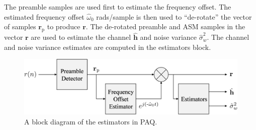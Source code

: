 The preamble samples are used first to estimate the frequency offset.
The estimated frequency offset $\hat{\omega}_0$ rads/sample is then used to ``de-rotate'' the vector of samples $\mathbf{r}_\text{p}$ to produce $\mathbf{r}$.
The de-rotated preamble and ASM samples in the vector $\mathbf{r}$ are used to estimate the channel $\hat{\mathbf{h}}$ and noise variance $\hat{\sigma}^2_w$.
The channel and noise variance estimates are computed in the estimators block.
\begin{figure}
	\centering\includegraphics[width=8.75in/100*55]{figures/intro/estimators.pdf}
	\caption{A block diagram of the estimators in PAQ.}
	\label{fig:estimators}
\end{figure}

